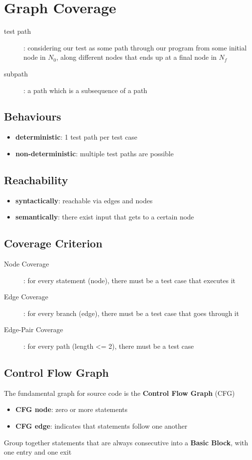 \documentclass[]{article}
\theoremstyle{definition}
\begin{document}
	\section{Graph Coverage}
		\begin{description}
			\item[test path]: considering our test as some path through our program from some initial node in $N_0$, along different nodes that ends up at a final node in $N_f$
			\item[subpath]: a path which is a subsequence of a path
		\end{description}
		\subsection{Behaviours}
			\begin{itemize}	
				\item \textbf{deterministic}: 	1 test path per test case
				\item \textbf{non-deterministic}: 	multiple test paths are possible
			\end{itemize}
		\subsection{Reachability}
			\begin{itemize}
				\item \textbf{syntactically}:	reachable via edges and nodes
				\item \textbf{semantically}:	there exist input that gets to a certain node
			\end{itemize}
		\subsection{Coverage Criterion}
			\begin{description}		
				\item[Node Coverage]: for every statement (node), there must be a test case that executes it
				\item[Edge Coverage]: for every branch (edge), there must be a test case that goes through it
				\item[Edge-Pair Coverage]: for every path (length <= 2), there must be a test case
			\end{description}
		\subsection{Control Flow Graph}
			The fundamental graph for source code is the \textbf{Control Flow Graph} (CFG)
			\begin{itemize}
				\item \textbf{CFG node}: zero or more statements
				\item \textbf{CFG edge}: indicates that statements follow one another
			\end{itemize}
			Group together statements that are always consecutive into a \textbf{Basic Block}, with one entry and one exit
			
\end{document}
